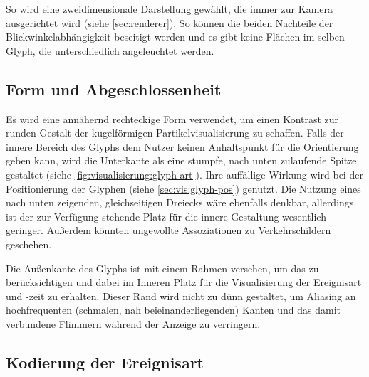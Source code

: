 So wird eine zweidimensionale Darstellung gewählt, die immer zur Kamera ausgerichtet wird (siehe \autoref{sec:renderer}). So können die beiden Nachteile der Blickwinkelabhängigkeit beseitigt werden und es gibt keine Flächen im selben Glyph, die unterschiedlich angeleuchtet werden.


\subsection*{Form und Abgeschlossenheit}
Es wird eine annähernd rechteckige Form verwendet, um einen Kontrast zur runden Gestalt der kugelförmigen Partikelvisualisierung zu schaffen. Falls der innere Bereich des Glyphs dem Nutzer keinen Anhaltspunkt für die Orientierung geben kann, wird die Unterkante als eine stumpfe, nach unten zulaufende Spitze gestaltet (siehe \autoref{fig:visualisierung:glyph-art}). Ihre auffällige Wirkung wird bei der Positionierung der Glyphen (siehe \autoref{sec:vis:glyph-pos}) genutzt. Die Nutzung eines nach unten zeigenden, gleichseitigen Dreiecks wäre ebenfalls denkbar, allerdings ist der zur Verfügung stehende Platz für die innere Gestaltung wesentlich geringer. Außerdem könnten ungewollte Assoziationen zu Verkehrschildern geschehen.

Die Außenkante des Glyphs ist mit einem Rahmen versehen, um das  zu berücksichtigen und dabei im Inneren Platz für die Visualisierung der Ereignisart und -zeit zu erhalten. Dieser Rand wird nicht zu dünn gestaltet, um Aliasing an hochfrequenten (schmalen, nah beieinanderliegenden) Kanten und das damit verbundene Flimmern während der Anzeige zu verringern.

\subsection*{Kodierung der Ereignisart}\label{sec:vis:glyph-art}

